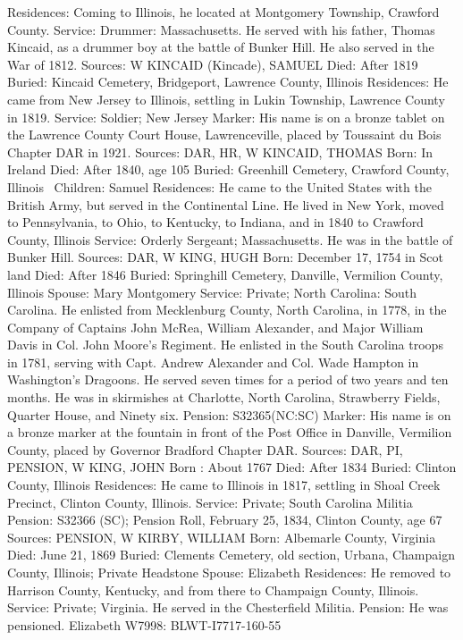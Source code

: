 Residences: Coming to Illinois, he located at Montgomery Township, Crawford County. 
Service: Drummer: Massachusetts. He served with his father, Thomas Kincaid, as a drummer boy at the battle of Bunker Hill. He also served in the War of 1812. 
Sources: W 
KINCAID (Kincade), SAMUEL
Died: After 1819
Buried: Kincaid Cemetery, Bridgeport, Lawrence County, Illinois
Residences: He came from New Jersey to Illinois, settling in Lukin Township, Lawrence County in 1819.
Service: Soldier; New Jersey
Marker: His name is on a bronze tablet on the Lawrence County Court House, Lawrenceville, placed by Toussaint du Bois Chapter DAR in 1921.
Sources: DAR, HR, W 
KINCAID, THOMAS
Born: In Ireland
Died: After 1840, age 105
Buried: Greenhill Cemetery, Crawford County, Illinois \
Children: Samuel
Residences: He came to the United States with the British Army, but served in the Continental Line. He lived in New York, moved to Pennsylvania, to Ohio, to Kentucky, to Indiana, and in 1840 to Crawford County, Illinois
Service: Orderly Sergeant; Massachusetts. He was in the battle of Bunker Hill.
Sources: DAR, W 
KING, HUGH
Born: December 17, 1754 in Scot land
Died: After 1846
Buried: Springhill Cemetery, Danville, Vermilion County, Illinois 
Spouse: Mary Montgomery
Service: Private; North Carolina: South Carolina. He enlisted from Mecklenburg County, North Carolina, in 1778, in the Company of Captains John McRea, William Alexander, and Major William Davis in Col. John Moore's Regiment. He enlisted in the South Carolina troops in 1781, serving with Capt. Andrew Alexander and Col. Wade Hampton in Washington's Dragoons. He served seven times for a period of two years and ten months. He was in skirmishes at Charlotte, North Carolina, Strawberry Fields, Quarter House, and Ninety six. 
Pension: S32365(NC:SC)
Marker: His name is on a bronze marker at the fountain in front of the Post Office in Danville, Vermilion County, placed by Governor Bradford Chapter DAR. 
Sources: DAR, PI, PENSION, W 
KING, JOHN 
Born : About 1767 
Died: After 1834 
Buried: Clinton County, Illinois 
Residences: He came to Illinois in 1817, settling in Shoal Creek Precinct, Clinton County, Illinois.
Service: Private; South Carolina Militia Pension: S32366 (SC); Pension Roll, February 25, 1834, Clinton County, age 67
Sources: PENSION, W 
KIRBY, WILLIAM
Born: Albemarle County, Virginia
Died: June 21, 1869
Buried: Clements Cemetery, old section, Urbana, Champaign County, Illinois; 
Private Headstone
Spouse: Elizabeth
Residences: He removed to Harrison County, Kentucky, and from there to Champaign County, Illinois.
Service: Private; Virginia. He served in the Chesterfield Militia. Pension: He was pensioned. Elizabeth W7998: BLWT-I7717-160-55
